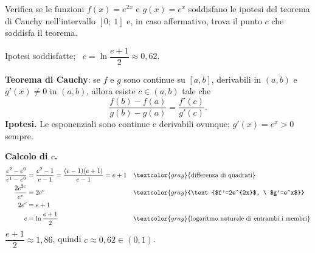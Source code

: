 \begin{question}[ID=1.3, subtitle={Teorema di Cauchy per $e^{2x}$ e $e^x$ su $[0,1]$}, tags={cauchy, teoremi}, difficulty=media]
Verifica se le funzioni \(f(x) = e^{2x}\) e \(g(x) = e^x\) soddisfano le ipotesi del teorema di Cauchy nell'intervallo \([0;\ 1]\) e, in caso affermativo, trova il punto \(c\) che soddisfa il teorema.
\begin{solution}
Ipotesi soddisfatte; \ $c=\ln\dfrac{e+1}{2}\approx0{,}62$.
\end{solution}
\begin{explanation}
\textbf{Teorema di Cauchy}: se $f$ e $g$ sono continue su $[a,b]$, derivabili in $(a,b)$ e $g'(x)\neq0$ in $(a,b)$, allora esiste $c\in(a,b)$ tale che
\[ \dfrac{f(b)-f(a)}{g(b)-g(a)}=\dfrac{f'(c)}{g'(c)}. \]
\textbf{Ipotesi.} Le esponenziali sono continue e derivabili ovunque; $g'(x)=e^x>0$ sempre.

\textbf{Calcolo di $c$.}
\[\begin{aligned}
\dfrac{e^2-e^0}{e^1-e^0} &= \dfrac{e^2-1}{e-1}=\dfrac{(e-1)(e+1)}{e-1}=e+1 && \textcolor{gray}{\text{differenza di quadrati}}\\
\dfrac{2e^{2c}}{e^c} &= 2e^c && \textcolor{gray}{\text{$f'=2e^{2x}$, \ $g'=e^x$}}\\
2e^c &= e+1\\
c &= \ln\dfrac{e+1}{2} && \textcolor{gray}{\text{logaritmo naturale di entrambi i membri}}
\end{aligned}\]
$\dfrac{e+1}{2}\approx1{,}86$, quindi $c\approx0{,}62\in(0,1)$.
\end{explanation}
\end{question}


